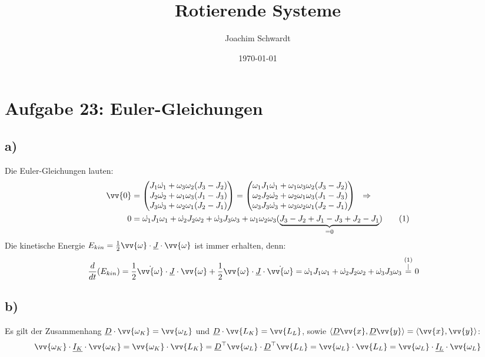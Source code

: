 \documentclass[a4paper,12pt]{article}
\newcommand\numberthis{\addtocounter{equation}{1}\tag{\theequation}}
\begin{document}
\title{Rotierende Systeme}
\author{Joachim Schwardt}
\date{\today}
\maketitle

\section*{Aufgabe 23: Euler-Gleichungen}
\subsection*{a)} Die Euler-Gleichungen lauten:
\begin{align*}
\vv{0}&=\begin{pmatrix} J_1\dot{\omega_1}+\omega_3\omega_2(J_3-J_2)\\ J_2\dot{\omega_2}+\omega_1\omega_3(J_1-J_3)\\ J_3\dot{\omega_3}+\omega_2\omega_1(J_2-J_1)  \end{pmatrix}=\begin{pmatrix} \omega_1 J_1\dot{\omega_1}+\omega_1\omega_3\omega_2(J_3-J_2)\\ \omega_2 J_2\dot{\omega_2}+\omega_2\omega_1\omega_3(J_1-J_3)\\ \omega_3 J_3\dot{\omega_3}+\omega_3\omega_2\omega_1(J_2-J_1)  \end{pmatrix}\ \ \Rightarrow\\
0&=\dot{\omega_1}J_1\omega_1+\dot{\omega_2}J_2\omega_2+\dot{\omega_3}J_3\omega_3 +\omega_1\omega_2\omega_3(\underbrace{J_3-J_2+J_1-J_3+J_2-J_1}_{=0}) \numberthis\label{Euler}
\end{align*}
Die kinetische Energie $E_{kin}=\frac12 \vv{\omega}\cdot\underline{J}\cdot\vv{\omega}$ ist immer erhalten, denn:
\begin{align*}
\frac{d}{dt}(E_{kin})&=\frac12 \dot{\vv{\omega}}\cdot\underline{J}\cdot\vv{\omega}+\frac12 \vv{\omega}\cdot\underline{J}\cdot\dot{\vv{\omega}}=\dot{\omega_1}J_1\omega_1+\dot{\omega_2}J_2\omega_2+\dot{\omega_3}J_3\omega_3\overset{\substack{(1)\\|}}{=}0
\end{align*}
\subsection*{b)} Es gilt der Zusammenhang $\underline{D}\cdot\vv{\omega_K}=\vv{\omega_L}$ und $\underline{D}\cdot\vv{L_K}=\vv{L_L}$, sowie $\langle \underline{D}\vv{x}, \underline{D}\vv{y}\rangle = \langle \vv{x},\vv{y}\rangle$:
\begin{align*}
\vv{\omega_K}\cdot\underline{I_K}\cdot\vv{\omega_K}=\vv{\omega_K}\cdot\vv{L_K}=\underline{D}^\top \vv{\omega_L}\cdot\underline{D}^\top \vv{L_L}=\vv{\omega_L}\cdot\vv{L_L}=\vv{\omega_L}\cdot\underline{I_L}\cdot\vv{\omega_L}
\end{align*}
\end{document}
